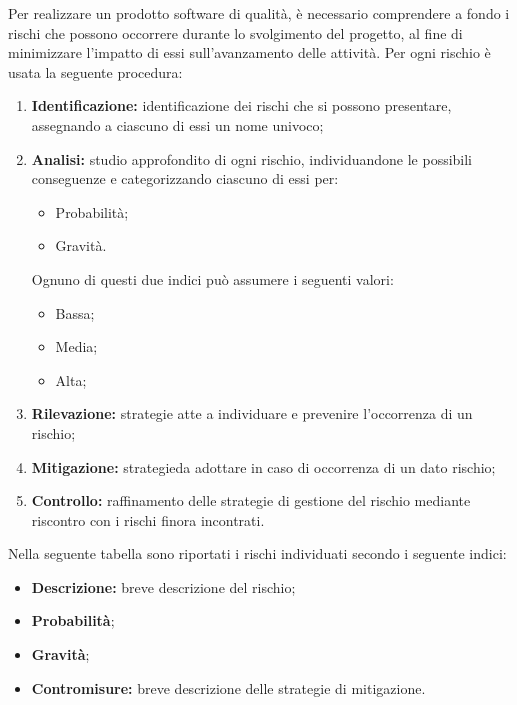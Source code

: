Per realizzare un prodotto software di {qualità}, è necessario
comprendere a fondo i rischi che possono occorrere durante lo svolgimento
del progetto, al fine di minimizzare l'impatto di essi sull'avanzamento
delle {attività}. \newline
Per ogni rischio è usata la seguente procedura:
\begin{enumerate}
    \item \textbf{Identificazione:}
           identificazione dei rischi che si possono presentare, assegnando a ciascuno di essi un nome univoco;
    \item \textbf{Analisi:} studio approfondito di ogni rischio, individuandone le possibili conseguenze e categorizzando ciascuno di essi per:
           \begin{itemize}
               \item Probabilità;
               \item Gravità.
           \end{itemize}
           Ognuno di questi due indici può assumere i seguenti valori:
           \begin{itemize}
               \item Bassa;
               \item Media;
               \item Alta;
           \end{itemize}
    \item \textbf{Rilevazione: }strategie atte a individuare e prevenire l'occorrenza di un rischio;
    \item \textbf{Mitigazione: }{strategie}\space da adottare in caso di occorrenza di un dato rischio;
    \item \textbf{Controllo:} raffinamento delle strategie di gestione del rischio mediante riscontro con i rischi
                              finora incontrati.
\end{enumerate}                         
Nella seguente tabella sono riportati i rischi individuati secondo i seguente indici:
\begin{itemize}
	\item \textbf{Descrizione: }breve descrizione del rischio; 
	\item \textbf{Probabilità};
    \item \textbf{Gravità};
    \item \textbf{Contromisure: }breve descrizione delle strategie di mitigazione.

\end{itemize}

